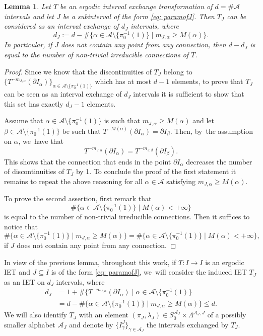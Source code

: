 \documentclass[JEP,XML,SOM,Unicode,NoEqCountersInSection,NoFloatCountersInSection,published]{cedram}
\theoremstyle{plain}
\newtheorem{lemma}[theorem]{Lemma}
\theoremstyle{definition}
\newcommand{\A}{\mathcal{A}}
\begin{document}
{\begin{lemma}\label{lem: alphabetafetrconnections}
Let $T$ be an ergodic interval exchange transformation of $d=\#\A$ intervals and let $J$ be a subinterval of the form \eqref{eq: paramofJ}. Then $T_J$ can be considered as an interval exchange of $d_J$ intervals, where
\[
d_J:= d - \#\{\alpha\in\A\setminus \{\pi_0^{-1}(1)\} \mid m_{J,\alpha}\ge M(\alpha)\}.
\]
In particular, if $J$ does not contain any point from any connection, then $d-d_J$ is equal to the number of non-trivial irreducible connections of $T$.
\end{lemma}

\skpt
\begin{proof}
Since we know that the discontinuities of $T_J$ belong to $\{T^{-m_{J,\alpha}}(\partial I_{\alpha})\}_{\alpha\in \A\setminus \{\pi_0^{-1}(1)\}}$ which has at most $d-1$ elements, to prove that $T_J$ can be seen as an interval exchange of $d_J$ intervals it is sufficient to show that this set has exactly $d_J-1$ elements.

Assume that $\alpha\in\A\setminus \{\pi_0^{-1}(1)\}$ is such that $m_{J,\alpha}\ge M(\alpha)$ and let $\beta\in \A\setminus \{\pi_0^{-1}(1)\}$ be such that $T^{-M(\alpha)}(\partial I_{\alpha})=\partial I_{\beta}$. Then, by~the assumption on $\alpha$, we~have that
\[
T^{-m_{J,\alpha}}(\partial I_{\alpha})=T^{-m_{J,\beta}}(\partial I_{\beta}).
\]
This shows that the connection that ends in the point $\partial I_{\alpha}$ decreases the number of discontinuities of $T_J$ by 1.
To conclude the proof of the first statement it remains to repeat the above reasoning for all $\alpha\in\A$ satisfying $m_{J,\alpha}\ge M(\alpha)$.

To prove the second assertion, first remark that
\[
\#\{\alpha\in\A\setminus \{\pi_0^{-1}(1)\} \mid M(\alpha) < +\infty\}
\]
is equal to the number of non-trivial irreducible connections. Then it suffices to notice that
\[
\#\{\alpha\in\A\setminus \{\pi_0^{-1}(1)\} \mid m_{J,\alpha}\ge M(\alpha)\} = \#\{\alpha\in\A\setminus \{\pi_0^{-1}(1)\} \mid M(\alpha) < +\infty\},
\]
if $J$ does not contain any point from any connection.
\end{proof}

In view of the previous lemma, throughout this work, if $T: I \to I$ is an ergodic IET and $J \subseteq I$ is of the form \eqref{eq: paramofJ}, we~will consider the induced IET $T_J$ as an IET on $d_J$ intervals, where
\begin{align*}
d_J &= 1 + \# \{T^{-m_{J,\alpha}}(\partial I_{\alpha}) \mid \alpha\in \A\setminus \{\pi_0^{-1}(1)\}\\
&= d -\#\{\alpha\in\A\setminus \{\pi_0^{-1}(1)\} \mid m_{J,\alpha}\ge M(\alpha)\} \leq d.
\end{align*}
We will also identify $T_J$ with an element $(\pi_J, \lambda_J) \in S_0^{\A_J} \times \Lambda^{\A_J, J}$ of a possibly smaller alphabet $\A_J$ and denote by $\{I_\gamma^J\}_{\gamma \in \A_J}$ the intervals exchanged by $T_J$.

}
\end{document}
